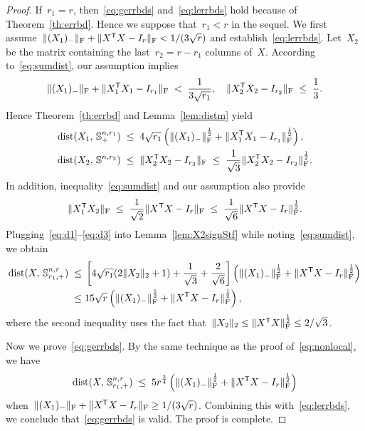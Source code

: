 \documentclass[11pt,a4paper]{article}  %
\theoremstyle{definition}
\DeclareMathOperator{\dist}{dist}
\newcommand{\col}{r}
\newcommand{\stf}[1]{\mathbb{S}^{#1}}
\newcommand{\fro}{{\scriptstyle{\textnormal{F}}}}
\newcommand{\trs}{{\scriptstyle{\mathsf{T}}}}
\begin{document}
 \begin{proof}
     If~$\col_1 = \col$, then~\eqref{eq:gerrbds} and~\eqref{eq:lerrbds} hold because of
     Theorem~\ref{th:errbd}. Hence we suppose that~$\col_1 < \col$ in the sequel.
     We first assume~$\|(X_1)_{-}\|_\fro + \|X^\trs  X - I_\col\|_\fro < 1/(3\sqrt{\col})$ and establish~\eqref{eq:lerrbds}.
     Let~$X_2$ be the matrix containing the last~$\col_2 = \col - \col_1$ columns of~$X$.
     According to~\eqref{eq:sumdist},
 our assumption implies
 \begin{gather}
     \nonumber
 \|(X_1)_{-}\|_\fro + \|X_1^\trs  X_1 - I_{\col_1}\|_\fro \;<\; \frac{1}{3\sqrt{\col_1}},
 \quad \|X_2^\trs X_2 - I_{\col_2}\|_\fro \;\le\; \frac{1}{3}.
 \end{gather}
Hence Theorem~\ref{th:errbd} and Lemma~\ref{lem:distm} yield
\begin{align}
        \label{eq:d1}
\dist(X_1,\, \stf{n,\col_1}_+) &
\;\le\; 4\sqrt{\col_1} \left(\|(X_1)_{-}\|_\fro^{\frac{1}{2}} + \|X^\trs_{1} X_{1} - I_{\col_1} \|_\fro^{\frac{1}{2}}\right),\\
        \label{eq:d2}
\dist(X_2,\, \stf{n,\col_2}) &
\;\le\;  \|X_2^\trs X_2-I_{\col_2}\|_\fro \;\le\; \frac{1}{\sqrt{3}}\|X_2^\trs X_2-I_{\col_2}\|_\fro^{\frac{1}{2}}.
\end{align}
In addition, inequality~\eqref{eq:sumdist} and our assumption also provide
\begin{equation}
  \label{eq:d3}
\|X_1^\trs X_2\|_\fro
\;\le\;  \frac{1}{\sqrt{2}}\|X^\trs X-I_{\col}\|_\fro \;\le\; \frac{1}{\sqrt{6}}\|X^\trs X-I_{\col}\|_\fro^{\frac{1}{2}}.
\end{equation}
Plugging~\eqref{eq:d1}--\eqref{eq:d3} into Lemma~\ref{lem:X2signStf}
while noting~\eqref{eq:sumdist}, we obtain
\begin{equation*}
\begin{split}
\dist(X,\, \stf{n,\col}_{\col_1,+}) \;\le\; &
\left[4\sqrt{\col_1}(2\|X_2\|_2 + 1) + \frac{1}{\sqrt{3}} + \frac{2}{\sqrt{6}} \right]
\left(\|(X_1)_{-}\|_\fro^{\frac{1}{2}} + \|X^\trs X -I_\col\|_\fro^{\frac{1}{2}}\right)\\
\le\; & 15 \sqrt{\col} \left(\|(X_1)_{-}\|_\fro^{\frac{1}{2}} + \|X^\trs X -I_\col\|_\fro^{\frac{1}{2}}
\right),
\end{split}
\end{equation*}
where the second inequality uses the fact that~$\|X_2\|_2\le\|X^\trs  X\|_\fro^{\frac{1}{2}} \le 2/\sqrt{3}$.

Now we prove~\eqref{eq:gerrbds}. By the same technique as the proof of~\eqref{eq:nonlocal}, we have
\begin{equation*}
\dist(X,\, \stf{n,\col}_{\col_1,+}) \;\le\; 5 \col^{\frac{3}{4}} \left(\|(X_1)_{-}\|_\fro^{\frac{1}{2}}
+  \|X^\trs X - I_\col\|_\fro^{\frac{1}{2}}\right)
\end{equation*}
when~$\|(X_1)_{-}\|_\fro + \|X^\trs  X - I_\col\|_\fro \ge 1/(3\sqrt{\col})$.
Combining this with~\eqref{eq:lerrbds}, we conclude that~\eqref{eq:gerrbds} is valid. The proof is
complete.
\end{proof}
\end{document}
